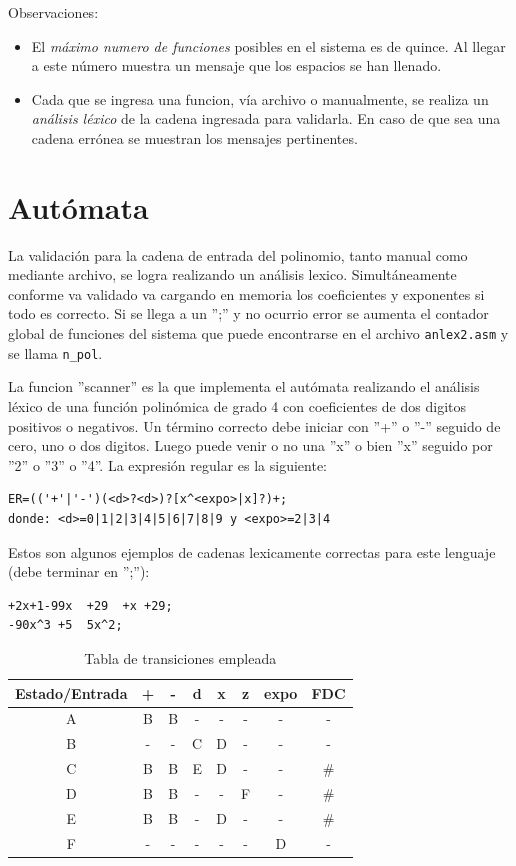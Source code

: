 \documentclass[journal]{../../IEEEtran/IEEEtran}
\begin{document}
Observaciones:
\begin{itemize}
\item El \textit{máximo numero de funciones} posibles en el sistema es
  de quince. Al llegar a este número muestra un mensaje que los
  espacios se han llenado.
\item Cada que se ingresa una funcion, vía archivo o manualmente, se
  realiza un \textit{análisis léxico} de la cadena ingresada para
  validarla. En caso de que sea una cadena errónea se muestran los
  mensajes pertinentes.
\end{itemize} 

\section{Autómata}
La validación para la cadena de entrada del polinomio, tanto manual
como mediante archivo, se logra realizando un análisis
lexico. Simultáneamente conforme va validado va cargando en memoria
los coeficientes y exponentes si todo es correcto. Si se llega a un
'';'' y no ocurrio error se aumenta el contador global de funciones
del sistema que puede encontrarse en el archivo \verb|anlex2.asm| y
se llama \verb|n_pol|.

La funcion ''scanner'' es la que implementa el autómata realizando el
análisis léxico de una función polinómica de grado 4 con coeficientes
de dos digitos positivos o negativos. Un término correcto debe iniciar
con ''+'' o ''-'' seguido de cero, uno o dos digitos. Luego puede
venir o no una ''x'' o bien ''x'' seguido por ''2'' o ''3'' o
''4''. La expresión regular es la siguiente:
\begin{verbatim}
ER=(('+'|'-')(<d>?<d>)?[x^<expo>|x]?)+;
donde: <d>=0|1|2|3|4|5|6|7|8|9 y <expo>=2|3|4
\end{verbatim}

Estos son algunos ejemplos de cadenas lexicamente correctas para este
lenguaje (debe terminar en '';''):
\begin{verbatim}
+2x+1-99x  +29  +x +29;
-90x^3 +5  5x^2;
\end{verbatim}


\begin{table}[H]
  \centering
  \caption{Tabla de transiciones empleada}
  \begin{tabular}{cccccccc}
 Estado/Entrada&         +&     -&     d&     x&     z&   expo&   FDC \\ \hline
      A&         	  B&     B&   -& -& -& -& -\\
B&	-& -&   C&     D&   -& -& -\\
C&	  B&     B&     E&     D&   -& -& \#\\
D&	  B&     B&   -& -&   F&   -& \#\\
E&	  B&     B&   -&   D&   -& -& \#\\
F&	-& -& -& -& -&   D&   -
  \end{tabular}
\end{table}
\end{document}
